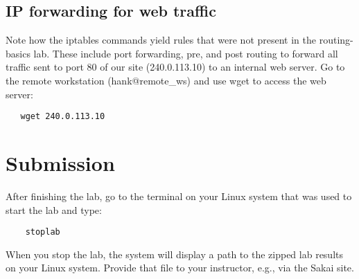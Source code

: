 \subsection{IP forwarding for web traffic}
Note how the iptables commands yield rules that were not present in the routing-basics lab.  These include port forwarding,
pre, and post routing to forward all traffic sent to port 80 of our site (240.0.113.10) to an
internal web server.   Go to the remote workstation (hank@remote\_ws) and use wget to access the web server:
\begin{verbatim}
   wget 240.0.113.10
\end{verbatim}

\section{Submission}
After finishing the lab, go to the terminal on your Linux system that was used to start the lab and type:
\begin{verbatim}
    stoplab 
\end{verbatim}
When you stop the lab, the system will display a path to the zipped lab results on your Linux system.  Provide that file to 
your instructor, e.g., via the Sakai site.


